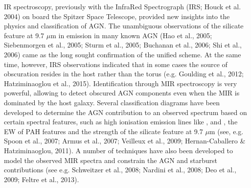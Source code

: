 \smallskip
\smallskip
\noindent
IR spectroscopy, previously with the InfraRed Spectrograph (IRS;
Houck et al. 2004) on board the Spitzer Space Telescope, provided new
insights into the physics and classification of AGN. The unambiguous
observations of the silicate feature at 9.7 $\mu$m in emission in many
known AGN (Hao et al., 2005; Siebenmorgen et al., 2005; Sturm et al.,
2005; Buchanan et al., 2006; Shi et al., 2006) came as the long sought
confirmation of the unified scheme. At the same time, however, IRS
observations indicated that in some cases the source of obscuration
resides in the host rather than the torus (e.g. Goulding et al., 2012;
Hatziminaoglou et al., 2015).  
Identification through MIR spectroscopy is very powerful, allowing to
detect obscured AGN components even when the MIR is dominated by the
host galaxy. Several classification diagrams have been developed to
determine the AGN contribution to an observed spectrum based on
certain spectral features, such as high ionisation emission lines like
\nev, \neii and \oiv, the EW of PAH features and the strength of the
silicate feature at 9.7 $\mu$m (see, e.g. Spoon et al., 2007; Armus et
al., 2007; Veilleux et al., 2009; Hernan-Caballero \& Hatziminaoglou,
2011). A number of techniques have also been developed to model the
observed MIR spectra and constrain the AGN and starburst contributions
(see e.g. Schweitzer et al., 2008; Nardini et al., 2008; Deo et al.,
2009; Feltre et al., 2013).

